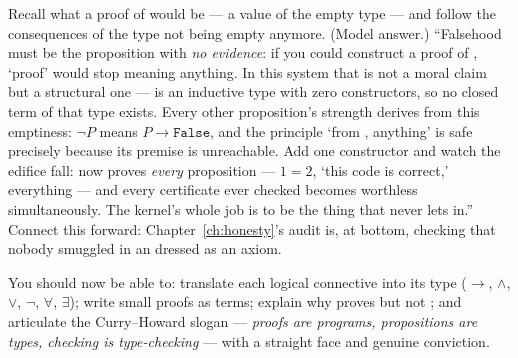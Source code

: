 \pathway Recall what a proof of  would be --- a value of the
empty type --- and follow the consequences of the type not being empty
anymore.
\answer (Model answer.) ``Falsehood must be the proposition with \emph{no
evidence}: if you could construct a proof of , `proof' would
stop meaning anything. In this system that is not a moral claim but a
structural one ---  is an inductive type with zero
constructors, so no closed term of that type exists. Every other
proposition's strength derives from this emptiness: $\lnot P$ means
$P \to \mathtt{False}$, and the principle `from , anything'
is safe precisely because its premise is unreachable. Add one constructor
 and watch the edifice fall: 
now proves \emph{every} proposition --- $1 = 2$, `this code is correct,'
everything --- and every certificate ever checked becomes worthless
simultaneously. The kernel's whole job is to be the thing that never lets
 in.'' Connect this forward: Chapter~\ref{ch:honesty}'s
 audit is, at bottom, checking that nobody smuggled
in an  dressed as an axiom.

\begin{checkpoint}
You should now be able to: translate each logical connective into its type
($\to$, $\land$, $\lor$, $\lnot$, $\forall$, $\exists$); write small proofs
as terms; explain why  proves  but not
; and articulate the Curry--Howard slogan --- \emph{proofs
are programs, propositions are types, checking is type-checking} --- with a
straight face and genuine conviction.
\end{checkpoint}
